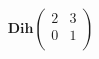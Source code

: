 \documentclass[preview]{standalone}
\begin{document}
\begin{align*}
\mathbf{Dih}\begin{pmatrix}2 & 3\\ 0 & 1\\\end{pmatrix}
\end{align*}
\end{document}
